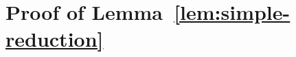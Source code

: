 \section{Proof of Lemma~\ref{lem:simple-reduction}}
\label{sec:proof-simple}

\SimpleReduction*



	
	
	
	
	
	


